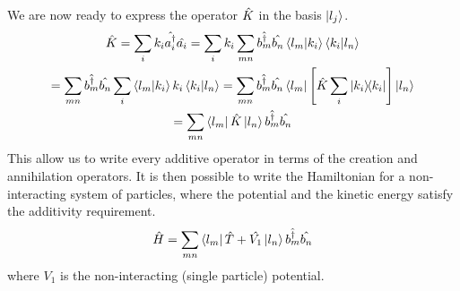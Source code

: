 We are now ready to express the operator $\hat{K}$ in the basis $\ket{l_j}$.
\begin{multline}
    \hat{K} =  \sum_i k_i  \hat{a_i^\dagger}\hat{a_i}
    = \sum_i k_i \sum_{mn} \hat{b_m^\dagger}\hat{b_n} \braket{l_m}{k_i}\braket{k_i}{l_n}
    \\ = \sum_{mn} \hat{b_m^\dagger}\hat{b_n} \sum_i \braket{l_m}{k_i} k_i \braket{k_i}{l_n}
    = \sum_{mn} \hat{b_m^\dagger}\hat{b_n} \bra{l_m} \left[ \hat{K} \sum_i \op{k_i} \right] \ket{l_n}
    \\= \sum_{mn}  \bra{l_m}\hat{K}\ket{l_n} \hat{b_m^\dagger}\hat{b_n}
\end{multline}
This allow us to write every additive operator in terms of the creation and annihilation operators. It is then possible to write the Hamiltonian for a non-interacting system of particles, where the potential and the kinetic energy satisfy the additivity requirement.
\begin{equation}
    \hat{H} = \sum_{mn} \bra{l_m}\hat{T}+\hat{V_1}\ket{l_n} \hat{b_m^\dagger}\hat{b_n}
\end{equation}
where $V_1$ is the non-interacting (single particle) potential.